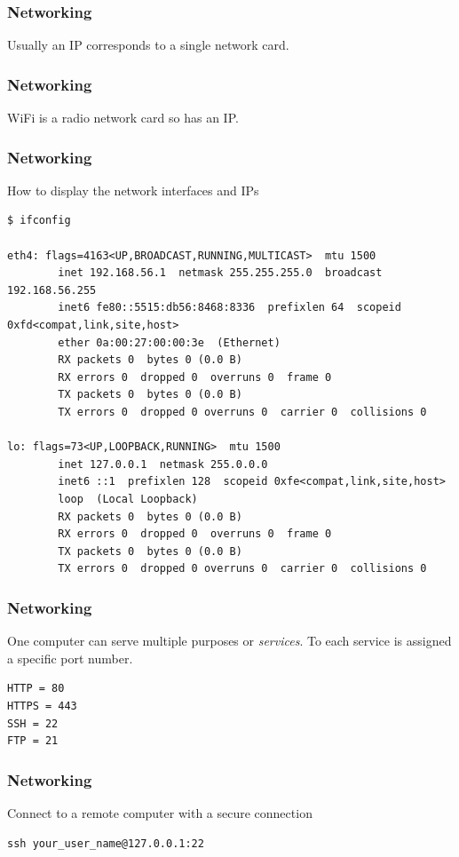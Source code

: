 \begin{frame}
\frametitle{Networking}
Usually an IP corresponds to a single network card.
\end{frame}

\begin{frame}
\frametitle{Networking}
WiFi is a radio network card so has an IP.
\end{frame}

\begin{frame}[fragile]
\frametitle{Networking}
How to display the network interfaces and IPs
\scriptsize
\begin{lstlisting}
$ ifconfig

eth4: flags=4163<UP,BROADCAST,RUNNING,MULTICAST>  mtu 1500
        inet 192.168.56.1  netmask 255.255.255.0  broadcast 192.168.56.255
        inet6 fe80::5515:db56:8468:8336  prefixlen 64  scopeid 0xfd<compat,link,site,host>
        ether 0a:00:27:00:00:3e  (Ethernet)
        RX packets 0  bytes 0 (0.0 B)
        RX errors 0  dropped 0  overruns 0  frame 0
        TX packets 0  bytes 0 (0.0 B)
        TX errors 0  dropped 0 overruns 0  carrier 0  collisions 0

lo: flags=73<UP,LOOPBACK,RUNNING>  mtu 1500
        inet 127.0.0.1  netmask 255.0.0.0
        inet6 ::1  prefixlen 128  scopeid 0xfe<compat,link,site,host>
        loop  (Local Loopback)
        RX packets 0  bytes 0 (0.0 B)
        RX errors 0  dropped 0  overruns 0  frame 0
        TX packets 0  bytes 0 (0.0 B)
        TX errors 0  dropped 0 overruns 0  carrier 0  collisions 0
\end{lstlisting}
\normalsize
\end{frame}

\begin{frame}[fragile]
\frametitle{Networking}
One computer can serve multiple purposes or \textit{services}.
To each service is assigned a specific port number.

\scriptsize
\begin{lstlisting}
HTTP = 80
HTTPS = 443
SSH = 22
FTP = 21
\end{lstlisting}
\normalsize
\end{frame}

\begin{frame}[fragile]
\frametitle{Networking}
Connect to a remote computer with a secure connection
\begin{lstlisting}
ssh your_user_name@127.0.0.1:22
\end{lstlisting}
\end{frame}
